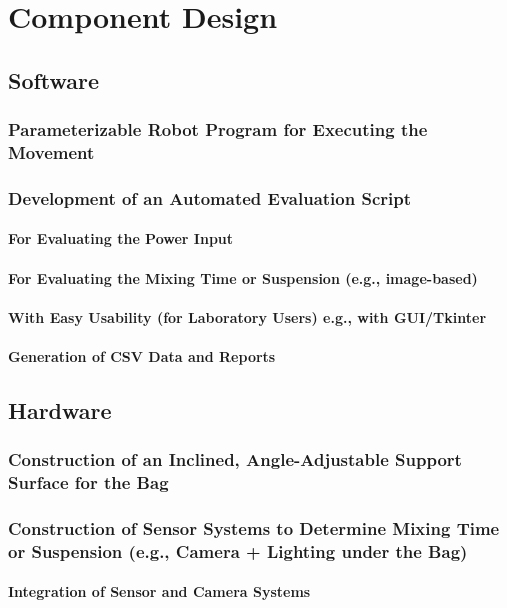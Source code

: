 \chapter{Component Design}
\section{Software}
\subsection{Parameterizable Robot Program for Executing the Movement}
\subsection{Development of an Automated Evaluation Script}
\subsubsection{For Evaluating the Power Input}
\subsubsection{For Evaluating the Mixing Time or Suspension (e.g., image-based)}
\subsubsection{With Easy Usability (for Laboratory Users) e.g., with GUI/Tkinter}
\subsubsection{Generation of CSV Data and Reports}
\section{Hardware}
\subsection{Construction of an Inclined, Angle-Adjustable Support Surface for the Bag}
\subsection{Construction of Sensor Systems to Determine Mixing Time or Suspension (e.g., Camera + Lighting under the Bag)}

\subsubsection{Integration of Sensor and Camera Systems}

